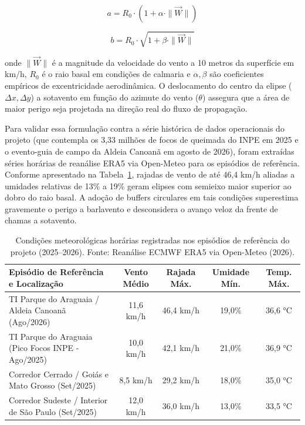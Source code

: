 \begin{equation}
a = R_0 \cdot \left(1 + \alpha \cdot \|\vec{W}\|\right)
\label{eq:semieixo_maior}
\end{equation}

\begin{equation}
b = R_0 \cdot \sqrt{1 + \beta \cdot \|\vec{W}\|}
\label{eq:semieixo_menor}
\end{equation}

\noindent onde $\|\vec{W}\|$ é a magnitude da velocidade do vento a 10 metros da superfície em km/h, $R_0$ é o raio basal em condições de calmaria e $\alpha, \beta$ são coeficientes empíricos de excentricidade aerodinâmica. O deslocamento do centro da elipse ($\Delta x, \Delta y$) a sotavento em função do azimute do vento ($\theta$) assegura que a área de maior perigo seja projetada na direção real do fluxo de propagação.

Para validar essa formulação contra a série histórica de dados operacionais do projeto (que contempla os 3,33 milhões de focos de queimada do INPE em 2025 e o evento-guia de campo da Aldeia Canoanã em agosto de 2026), foram extraídas séries horárias de reanálise ERA5 via Open-Meteo \cite{hersbach2020era5} para os episódios de referência. Conforme apresentado na Tabela~\ref{tab:clima_revisao}, rajadas de vento de até 46,4 km/h aliadas a umidades relativas de 13\% a 19\% geram elipses com semieixo maior superior ao dobro do raio basal. A adoção de buffers circulares em tais condições superestima gravemente o perigo a barlavento e desconsidera o avanço veloz da frente de chamas a sotavento.

\begin{table}[htbp]
\centering
\footnotesize
\setlength{\tabcolsep}{5pt}
\caption{Condições meteorológicas horárias registradas nos episódios de referência do projeto (2025--2026). Fonte: Reanálise ECMWF ERA5 via Open-Meteo (2026).}
\label{tab:clima_revisao}
\begin{tabular}{lcccc}
\hline
\textbf{Episódio de Referência e Localização} & \textbf{Vento Médio} & \textbf{Rajada Máx.} & \textbf{Umidade Mín.} & \textbf{Temp. Máx.} \\
\hline
TI Parque do Araguaia / Aldeia Canoanã (Ago/2026) & 11,6 km/h & 46,4 km/h & 19,0\% & 36,6 °C \\
TI Parque do Araguaia (Pico Focos INPE - Ago/2025) & 10,0 km/h & 42,1 km/h & 21,0\% & 36,9 °C \\
Corredor Cerrado / Goiás e Mato Grosso (Set/2025) & 8,5 km/h & 29,2 km/h & 18,0\% & 35,0 °C \\
Corredor Sudeste / Interior de São Paulo (Set/2025) & 12,0 km/h & 36,0 km/h & 13,0\% & 33,5 °C \\
\hline
\end{tabular}
\end{table}


